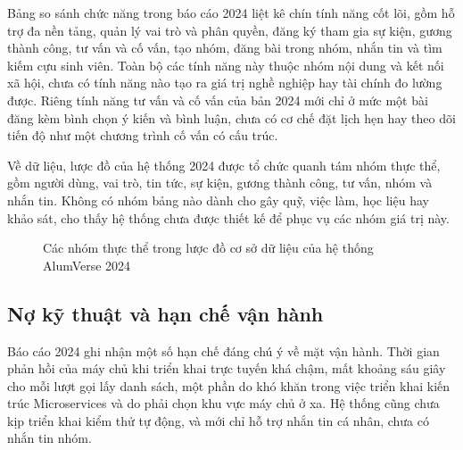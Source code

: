 \documentclass[12pt,a4paper,oneside]{report}
\begin{document}
Bảng so sánh chức năng trong báo cáo 2024 liệt kê chín tính năng cốt lõi, gồm hỗ trợ đa nền tảng, quản lý vai trò và phân quyền, đăng ký tham gia sự kiện, gương thành công, tư vấn và cố vấn, tạo nhóm, đăng bài trong nhóm, nhắn tin và tìm kiếm cựu sinh viên. Toàn bộ các tính năng này thuộc nhóm nội dung và kết nối xã hội, chưa có tính năng nào tạo ra giá trị nghề nghiệp hay tài chính đo lường được. Riêng tính năng tư vấn và cố vấn của bản 2024 mới chỉ ở mức một bài đăng kèm bình chọn ý kiến và bình luận, chưa có cơ chế đặt lịch hẹn hay theo dõi tiến độ như một chương trình cố vấn có cấu trúc.

Về dữ liệu, lược đồ của hệ thống 2024 được tổ chức quanh tám nhóm thực thể, gồm người dùng, vai trò, tin tức, sự kiện, gương thành công, tư vấn, nhóm và nhắn tin. Không có nhóm bảng nào dành cho gây quỹ, việc làm, học liệu hay khảo sát, cho thấy hệ thống chưa được thiết kế để phục vụ các nhóm giá trị này.

\begin{figure}[H]\centering
{}
\caption{Các nhóm thực thể trong lược đồ cơ sở dữ liệu của hệ thống AlumVerse 2024}
\label{fig:erd2024}
\end{figure}

\subsection{Nợ kỹ thuật và hạn chế vận hành}

Báo cáo 2024 ghi nhận một số hạn chế đáng chú ý về mặt vận hành. Thời gian phản hồi của máy chủ khi triển khai trực tuyến khá chậm, mất khoảng sáu giây cho mỗi lượt gọi lấy danh sách, một phần do khó khăn trong việc triển khai kiến trúc Microservices và do phải chọn khu vực máy chủ ở xa. Hệ thống cũng chưa kịp triển khai kiểm thử tự động, và mới chỉ hỗ trợ nhắn tin cá nhân, chưa có nhắn tin nhóm.
\end{document}
